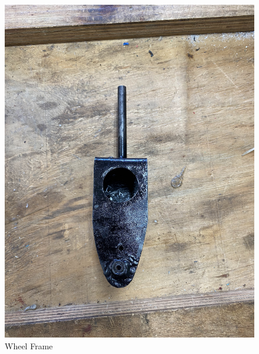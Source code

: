 \begin{figure}[H]
    \includegraphics[scale = 0.07]{Figures/wheelFRAMEempty2.jpg}
    \caption{Wheel Frame}
    \label{fig:frameFAB}
\end{figure}

